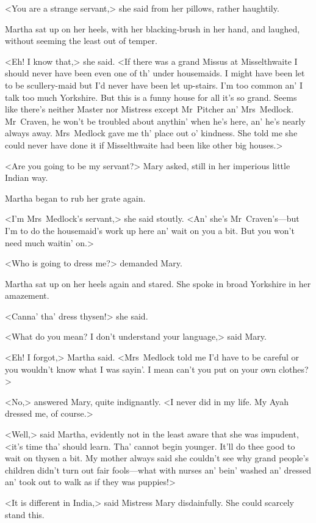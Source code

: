 <You are a strange servant,> she said from her pillows, rather haughtily.

Martha sat up on her heels, with her blacking-brush in her hand, and laughed, without seeming the least out of temper.

<Eh! I know that,> she said. <If there was a grand Missus at Misselthwaite I should never have been even one of th' under housemaids. I might have been let to be scullery-maid but I'd never have been let up-stairs. I'm too common an' I talk too much Yorkshire. But this is a funny house for all it's so grand. Seems like there's neither Master nor Mistress except Mr~Pitcher an' Mrs~Medlock. Mr~Craven, he won't be troubled about anythin' when he's here, an' he's nearly always away. Mrs~Medlock gave me th' place out o' kindness. She told me she could never have done it if Misselthwaite had been like other big houses.>

<Are you going to be my servant?> Mary asked, still in her imperious little Indian way.

Martha began to rub her grate again.

<I'm Mrs~Medlock's servant,> she said stoutly. <An' she's Mr~Craven's—but I'm to do the housemaid's work up here an' wait on you a bit. But you won't need much waitin' on.>

<Who is going to dress me?> demanded Mary.

Martha sat up on her heels again and stared. She spoke in broad Yorkshire in her amazement.

<Canna' tha' dress thysen!> she said.

<What do you mean? I don't understand your language,> said Mary.

<Eh! I forgot,> Martha said. <Mrs~Medlock told me I'd have to be careful or you wouldn't know what I was sayin'. I mean can't you put on your own clothes?>

<No,> answered Mary, quite indignantly. <I never did in my life. My Ayah dressed me, of course.>

<Well,> said Martha, evidently not in the least aware that she was impudent, <it's time tha' should learn. Tha' cannot begin younger. It'll do thee good to wait on thysen a bit. My mother always said she couldn't see why grand people's children didn't turn out fair fools—what with nurses an' bein' washed an' dressed an' took out to walk as if they was puppies!>

<It is different in India,> said Mistress Mary disdainfully. She could scarcely stand this.

